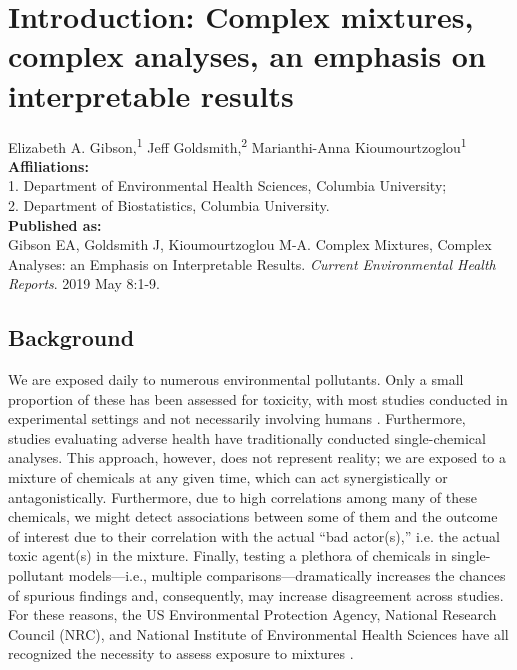 \chapter[Introduction]{Introduction: Complex mixtures, complex analyses, an emphasis on interpretable results}
\vspace{-3em}

\begin{center}
Elizabeth A. Gibson,\textsuperscript{1} 
Jeff Goldsmith,\textsuperscript{2} 
Marianthi-Anna Kioumourtzoglou\textsuperscript{1} \\

\textbf{Affiliations:} \\ 
1. Department of Environmental Health Sciences, Columbia University; \\ 
2. Department of Biostatistics, Columbia University. \\ 

\textbf{Published as:} \\
Gibson EA, Goldsmith J, Kioumourtzoglou M-A. Complex Mixtures, Complex Analyses: an Emphasis on Interpretable Results. \textit{Current Environmental Health Reports}. 2019 May 8:1-9.
\end{center}
\label{sec:intro}

\clearpage

\section{Background}\label{sec:Intro}

We are exposed daily to numerous environmental pollutants. Only a small proportion of these has been assessed for toxicity, with most studies conducted in experimental settings and not necessarily involving humans \citep{grandjean06}. Furthermore, studies evaluating adverse health have traditionally conducted single-chemical analyses. This approach, however, does not represent reality; we are exposed to a mixture of chemicals at any given time, which can act synergistically or antagonistically. Furthermore, due to high correlations among many of these chemicals, we might detect associations between some of them and the outcome of interest due to their correlation with the actual ``bad actor(s),'' i.e. the actual toxic agent(s) in the mixture. Finally, testing a plethora of chemicals in single-pollutant models---i.e., multiple comparisons---dramatically increases the chances of spurious findings and, consequently, may increase disagreement across studies. For these reasons, the US Environmental Protection Agency, National Research Council (NRC), and National Institute of Environmental Health Sciences have all recognized the necessity to assess exposure to mixtures \citep{epaSP, nrc}.

